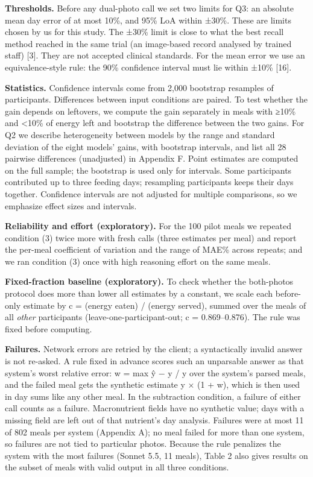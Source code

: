 \documentclass[
  11pt,
  letterpaper]{article}
\begin{document}
\textbf{Thresholds.} Before any dual-photo call we set two limits for Q3: an absolute mean day error of at
most 10\%, and 95\% LoA within ±30\%. These are limits chosen by us for this study. The ±30\% limit is close
to what the best recall method reached in the same trial (an image-based record analysed by trained staff)
{[}3{]}. They are not accepted clinical standards. For the mean error we use an equivalence-style rule: the
90\% confidence interval must lie within ±10\% {[}16{]}.

\textbf{Statistics.} Confidence intervals come from 2,000 bootstrap resamples of participants. Differences
between input conditions are paired. To test whether the gain depends on leftovers, we compute the gain
separately in meals with ≥10\% and \textless10\% of energy left and bootstrap the difference between the two
gains. For Q2 we describe heterogeneity between models by the range and standard deviation of the eight
models' gains, with bootstrap intervals, and list all 28 pairwise differences (unadjusted) in Appendix F.
Point estimates are computed on the full sample; the bootstrap is used only for intervals. Some participants
contributed up to three feeding days; resampling participants keeps their days together. Confidence intervals
are not adjusted for multiple comparisons, so we emphasize effect sizes and intervals.

\textbf{Reliability and effort (exploratory).} For the 100 pilot meals we repeated condition (3) twice more
with fresh calls (three estimates per meal) and report the per-meal coefficient of variation and the range of
MAE\% across repeats; and we ran condition (3) once with high reasoning effort on the same meals.

\textbf{Fixed-fraction baseline (exploratory).} To check whether the both-photos protocol does more than lower
all estimates by a constant, we scale each before-only estimate by c = (energy eaten) / (energy served),
summed over the meals of all \emph{other} participants (leave-one-participant-out; c = 0.869--0.876). The rule
was fixed before computing.

\textbf{Failures.} Network errors are retried by the client; a syntactically invalid answer is not re-asked. A
rule fixed in advance scores such an unparsable answer as that system's worst relative error: w = max
\textbar ŷ − y\textbar{} / y over the system's parsed meals, and the failed meal gets the synthetic estimate y
× (1 + w), which is then used in day sums like any other meal. In the subtraction condition, a failure of
either call counts as a failure. Macronutrient fields have no synthetic value; days with a missing field are
left out of that nutrient's day analysis. Failures were at most 11 of 802 meals per system (Appendix A); no
meal failed for more than one system, so failures are not tied to particular photos. Because the rule
penalizes the system with the most failures (Sonnet 5.5, 11 meals), Table 2 also gives results on the subset
of meals with valid output in all three conditions.
\end{document}
